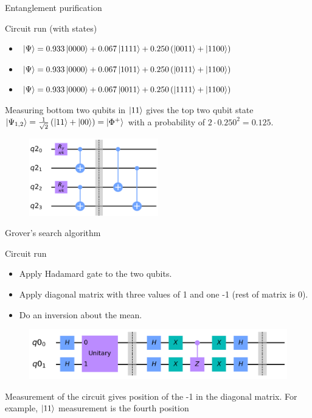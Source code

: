 \begin{frame}{Entanglement purification}
	
	\begin{block}{Circuit run (with states)}
		\begin{itemize}
			\item $\ket{\Psi} = 0.933\ket{0000}+0.067\ket{1111}
			+0.250\left(\ket{0011}+\ket{1100}\right)$
			\item $\ket{\Psi} = 0.933\ket{0000}+0.067\ket{1011}
			+0.250\left(\ket{0111}+\ket{1100}\right)$
			\item $\ket{\Psi} =
			0.933\ket{0000}+0.067\ket{0011} +0.250\left(\ket{1111}+\ket{1100}\right)$
		\end{itemize}
	\end{block}

Measuring bottom two qubits in $\ket{11}$ gives the top two qubit state
$\ket{\Psi_{1,2}} = \frac{1}{\sqrt{2}}\left(\ket{11} +\ket{00}\right) =
\ket{\Phi^+}$ with a probability of $2\cdot0.250^2 = 0.125$.
	
	\begin{figure}[h] \centering
		\includegraphics[width=0.5\textwidth]{images/purification_circuit.png}
		\label{fig:puri_circ}
	\end{figure}
	
\end{frame}

\begin{frame}{Grover's search algorithm}
		
	\begin{block}{Circuit run}
		\begin{itemize}
			\item Apply Hadamard gate to the two qubits.
			\item Apply diagonal matrix with three values of 1 and one -1 (rest of matrix is 0).
			\item Do an inversion about the mean.
		\end{itemize}
	\end{block}
	

	\begin{figure}[h] \centering
		\includegraphics[width=\textwidth]{images/grover_circuit.png}
		\label{fig:grov_circ}
	\end{figure}
Measurement of the circuit gives position of the -1 in the diagonal matrix. For example, $\ket{11}$ measurement is the fourth position
	
\end{frame}

